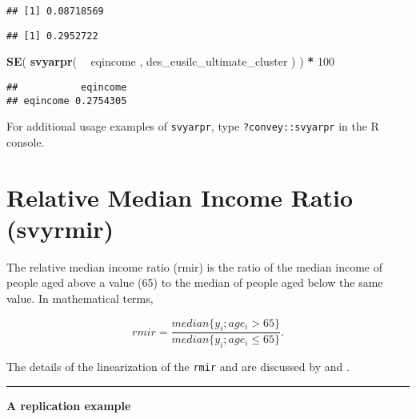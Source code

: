 \documentclass[]{book}
\newenvironment{Shaded}{\begin{snugshade}}{\end{snugshade}}
\newcommand{\CommentTok}[1]{\textcolor[rgb]{0.56,0.35,0.01}{\textit{#1}}}
\newcommand{\DecValTok}[1]{\textcolor[rgb]{0.00,0.00,0.81}{#1}}
\newcommand{\KeywordTok}[1]{\textcolor[rgb]{0.13,0.29,0.53}{\textbf{#1}}}
\newcommand{\NormalTok}[1]{#1}
\newcommand{\OperatorTok}[1]{\textcolor[rgb]{0.81,0.36,0.00}{\textbf{#1}}}
\newcommand{\StringTok}[1]{\textcolor[rgb]{0.31,0.60,0.02}{#1}}
\begin{document}
\begin{verbatim}
## [1] 0.08718569
\end{verbatim}

\begin{Shaded}
\end{Shaded}

\begin{verbatim}
## [1] 0.2952722
\end{verbatim}

\begin{Shaded}
\begin{Highlighting}[]
\KeywordTok{SE}\NormalTok{( }\KeywordTok{svyarpr}\NormalTok{( }\OperatorTok{~}\StringTok{ }\NormalTok{eqincome , des_eusilc_ultimate_cluster ) ) }\OperatorTok{*}\StringTok{ }\DecValTok{100}
\end{Highlighting}
\end{Shaded}

\begin{verbatim}
##           eqincome
## eqincome 0.2754305
\end{verbatim}

For additional usage examples of \texttt{svyarpr}, type \texttt{?convey::svyarpr} in the R console.

\hypertarget{relative-median-income-ratio-svyrmir}{%
\section{Relative Median Income Ratio (svyrmir)}\label{relative-median-income-ratio-svyrmir}}

The relative median income ratio (rmir) is the ratio of the median income of people aged above a value (65) to the median of people aged below the same value. In mathematical terms,

\[
rmir = \frac{median\{y_i; age_i >65 \}}{median\{y_i; age_i \leq 65 \}}.
\]

The details of the linearization of the \texttt{rmir} and are discussed by \citet{deville1999} and \citet{osier2009}.

\begin{center}\rule{0.5\linewidth}{0.5pt}\end{center}

\textbf{A replication example}
\end{document}
